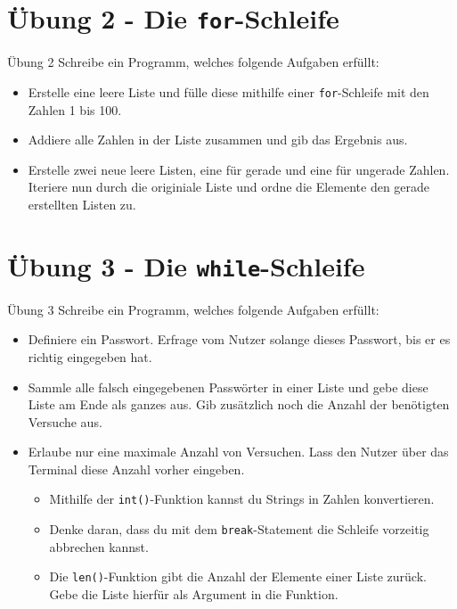 \section{Übung 2 - Die \alert{\texttt{for}}-Schleife}	
\begin{frame}{Übung 2}
	Schreibe ein Programm, welches folgende Aufgaben erfüllt:
	\linebreak
	\begin{itemize}
		\item[\textbf{1.}] Erstelle eine leere Liste und fülle diese mithilfe einer \alert{\texttt{for}}-Schleife mit den Zahlen 1 bis 100.
		\item[\textbf{2.}] Addiere alle Zahlen in der Liste zusammen und gib das Ergebnis aus.
		\item[\textbf{3.}] Erstelle zwei neue leere Listen, eine für gerade und eine für ungerade Zahlen. Iteriere nun durch die originiale Liste und ordne die Elemente den gerade erstellten Listen zu.
		\end{itemize}
\end{frame}

\section{Übung 3 - Die \alert{\texttt{while}}-Schleife}
\begin{frame}{Übung 3}
Schreibe ein Programm, welches folgende Aufgaben erfüllt:
	\linebreak
	\begin{itemize}
		\item[\textbf{1.}] Definiere ein Passwort. Erfrage vom Nutzer solange dieses Passwort, bis er es richtig eingegeben hat.
		\item[\textbf{2.}] Sammle alle falsch eingegebenen Passwörter in einer Liste und gebe diese Liste am Ende als ganzes aus. Gib zusätzlich noch die Anzahl der benötigten Versuche aus.
		\item[\textbf{3.}] Erlaube nur eine maximale Anzahl von Versuchen. Lass den Nutzer über das Terminal diese Anzahl vorher eingeben.
		\begin{itemize}
			\item[\textbf{Tipp 1:}] Mithilfe der \alert{\texttt{int()}}-Funktion kannst du Strings in Zahlen konvertieren.
			\item[\textbf{Tipp 2:}] Denke daran, dass du mit dem \alert{\texttt{break}}-Statement die Schleife vorzeitig abbrechen kannst.
			\item[\textbf{Tipp 3:}] Die \alert{\texttt{len()}}-Funktion gibt die Anzahl der Elemente einer Liste zurück. Gebe die Liste hierfür als Argument in die Funktion.
		\end{itemize}
	\end{itemize}
\end{frame}

